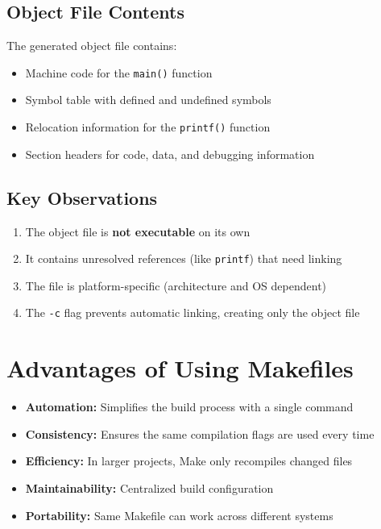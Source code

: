 \documentclass[12pt,a4paper]{article}
\begin{document}
\subsection{Object File Contents}
The generated object file contains:
\begin{itemize}
    \item Machine code for the \texttt{main()} function
    \item Symbol table with defined and undefined symbols
    \item Relocation information for the \texttt{printf()} function
    \item Section headers for code, data, and debugging information
\end{itemize}

\subsection{Key Observations}
\begin{enumerate}
    \item The object file is \textbf{not executable} on its own
    \item It contains unresolved references (like \texttt{printf}) that need linking
    \item The file is platform-specific (architecture and OS dependent)
    \item The \texttt{-c} flag prevents automatic linking, creating only the object file
\end{enumerate}

\section{Advantages of Using Makefiles}
\begin{itemize}
    \item \textbf{Automation:} Simplifies the build process with a single command
    \item \textbf{Consistency:} Ensures the same compilation flags are used every time
    \item \textbf{Efficiency:} In larger projects, Make only recompiles changed files
    \item \textbf{Maintainability:} Centralized build configuration
    \item \textbf{Portability:} Same Makefile can work across different systems
\end{itemize}
\end{document}
